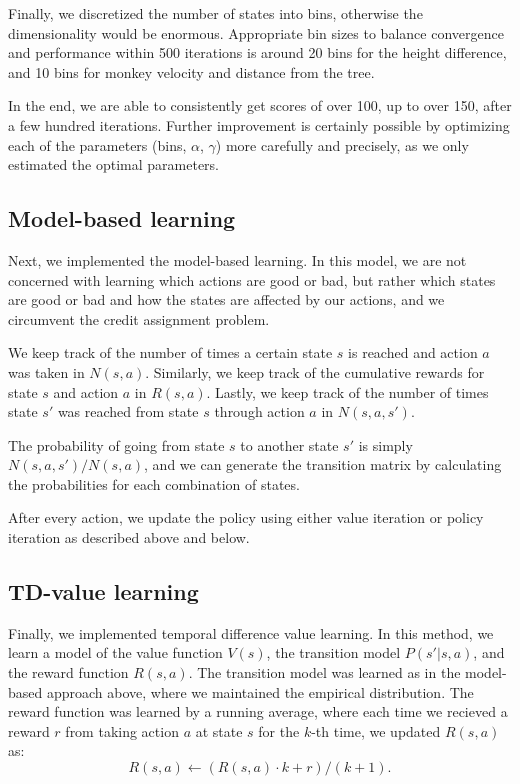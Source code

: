 \documentclass[11pt]{amsart}
\begin{document}
Finally, we discretized the number of states into bins, otherwise the dimensionality would be enormous. Appropriate bin sizes to balance convergence and performance within 500 iterations is around 20 bins for the height difference, and 10 bins for monkey velocity and distance from the tree.

In the end, we are able to consistently get scores of over 100, up to over 150, after a few hundred iterations. Further improvement is certainly possible by optimizing each of the parameters (bins, $\alpha$, $\gamma$) more carefully and precisely, as we only estimated the optimal parameters.

\subsection{Model-based learning}

Next, we implemented the model-based learning. In this model, we are not concerned with learning which actions are good or bad, but rather which states are good or bad and how the states are affected by our actions, and we circumvent the credit assignment problem. 

We keep track of the number of times a certain state $s$ is reached and action $a$ was taken in $N(s,a)$. Similarly, we keep track of the cumulative rewards for state $s$ and action $a$ in $R(s,a)$. Lastly, we keep track of the number of times state $s'$ was reached from state $s$ through action $a$ in $N(s,a,s')$. 

The probability of going from state $s$ to another state $s'$ is simply $N(s,a,s')/N(s,a)$, and we can generate the transition matrix by calculating the probabilities for each combination of states.

After every action, we update the policy using either value iteration or policy iteration as described above and below.

\subsection{TD-value learning}

Finally, we implemented temporal difference value learning. In this method, we learn a model of the value function $V(s)$, the transition model $P(s'|s,a)$, and the reward function $R(s,a)$. The transition model was learned as in the model-based approach above, where we maintained the empirical distribution. The reward function was learned by a running average, where each time we recieved a reward $r$ from taking action $a$ at state $s$ for the $k$-th time, we updated $R(s,a)$ as:
$$R(s,a) \gets (R(s,a) \cdot k + r)/(k + 1).$$
\end{document}
